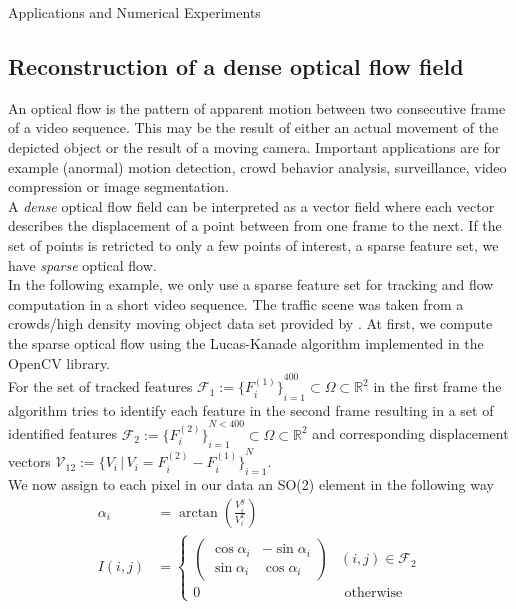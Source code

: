 \begin{chapter}{Applications and Numerical Experiments}
\FloatBarrier
\subsection{Reconstruction of a dense optical flow field} %
\label{sub:reconstructionDenseOpticalFlow}
An optical flow is the pattern of apparent motion between two consecutive frame of a video sequence. This may be the result of either an actual movement of the depicted object
or the result of a moving camera. Important applications are for example (anormal) motion detection, crowd behavior analysis, surveillance, video compression or image segmentation.\\
A \emph{dense} optical flow field can be interpreted as a vector field where each vector describes the displacement of a point between from one frame to the next. If
the set of points is retricted to only a few points of interest, a sparse feature set, we have \emph{sparse} optical flow.\\

In the following example, we only use a sparse feature set for tracking and flow computation in a short video sequence. The traffic scene was taken from a crowds/high density moving object data 
set provided by \cite{AliShah}. At first, we compute the sparse optical flow using the Lucas-Kanade algorithm \cite{LucasKanade} implemented in the OpenCV library. \\
For the set of tracked features 
$\mathcal{F}_1:=\lbrace{F^{(1)}_i\rbrace}_{i=1}^{400}\subset\Omega\subset\mathbb{R}^2$ in the first frame the algorithm tries to identify each feature in the second frame resulting in a set of
identified features $\mathcal{F}_2:=\lbrace{F^{(2)}_i\rbrace}_{i=1}^{N<400}\subset\Omega\subset\mathbb{R}^2$ and corresponding displacement vectors 
$\mathcal{V}_{12}:=\lbrace{V_i\,|\,V_i=F_i^{(2)}-F_i^{(1)}\rbrace}_{i=1}^{N}$.\\

We now assign to each pixel in our data an SO(2) element in the following way
\begin{align}
    \alpha_i &=\arctan\left(\frac{V^y_i}{V^x_i}\right) \\
    I(i,j) &= 
    \begin{cases}
    	\begin{pmatrix}
	    \cos\alpha_i    & -\sin\alpha_i\\
	    \sin\alpha_i    & \cos\alpha_i
	\end{pmatrix} & (i,j)\in \mathcal{F}_{2} \\
	0 & \text{ otherwise}
    \end{cases}
\end{align}


\end{chapter}
